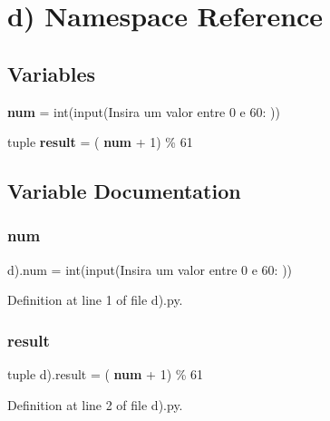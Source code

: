 \section{d) Namespace Reference}
\label{namespaced_08}
\subsection*{Variables}
\begin{DoxyCompactItemize}
\item 
\textbf{ num} = int(input(\textquotesingle{}Insira um valor entre 0 e 60\+: \textquotesingle{}))
\item 
tuple \textbf{ result} = (\textbf{ num} + 1) \% 61
\end{DoxyCompactItemize}


\subsection{Variable Documentation}
\mbox{\label{namespaced_08_a810c5e9e7b76158240c396aef703fe4d}} 
\subsubsection{num}
{\footnotesize\ttfamily d).num = int(input(\textquotesingle{}Insira um valor entre 0 e 60\+: \textquotesingle{}))}



Definition at line 1 of file d).\+py.

\mbox{\label{namespaced_08_af7cf88418b9a0dadbd20ec043cfffb5e}} 
\subsubsection{result}
{\footnotesize\ttfamily tuple d).result = (\textbf{ num} + 1) \% 61}



Definition at line 2 of file d).\+py.

